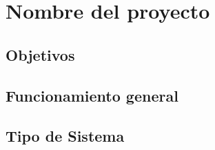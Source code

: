 \chapter*{Nombre del proyecto}

\section{Objetivos}

\section{Funcionamiento general}

\section{Tipo de Sistema}